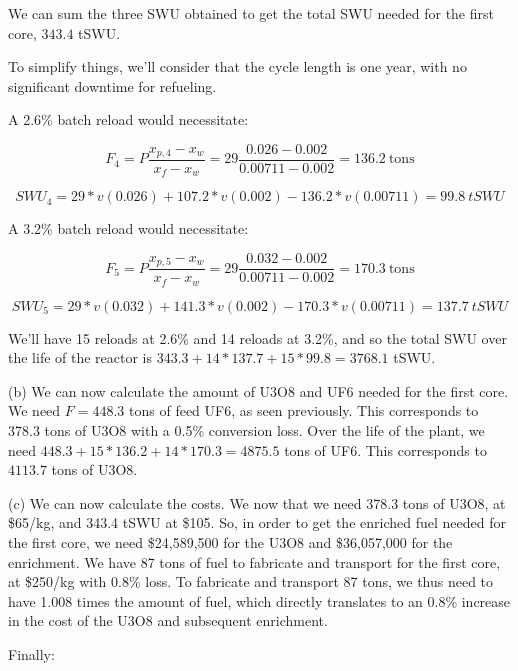 We can sum the three SWU obtained to get the total SWU needed for the first core, $343.4$ tSWU.

To simplify things, we'll consider that the cycle length is one year, with no significant downtime for refueling.

A 2.6\% batch reload would necessitate:

\begin{equation}
F_4 = P\frac{x_{p,4} - x_w}{x_f - x_w} = 29\frac{0.026-0.002}{0.00711-0.002} = 136.2\ \text{tons}
\end{equation}

\begin{equation}
SWU_4 = 29*v(0.026) + 107.2*v(0.002) - 136.2*v(0.00711) = 99.8\ tSWU
\end{equation}

A 3.2\% batch reload would necessitate:

\begin{equation}
F_5 = P\frac{x_{p,5} - x_w}{x_f - x_w} = 29\frac{0.032-0.002}{0.00711-0.002} = 170.3\ \text{tons}
\end{equation}

\begin{equation}
SWU_5 = 29*v(0.032) + 141.3*v(0.002) - 170.3*v(0.00711) = 137.7\ tSWU
\end{equation}

We'll have 15 reloads at 2.6\% and 14 reloads at 3.2\%, and so the total SWU over the life of the reactor is $343.3 + 14*137.7 + 15*99.8 = 3768.1$ tSWU.


(b) We can now calculate the amount of U3O8 and UF6 needed for the first core. We need $F = 448.3$ tons of feed UF6, as seen previously. This corresponds to 378.3 tons of U3O8 with a 0.5\% conversion loss. Over the life of the plant, we need $448.3 + 15 * 136.2 + 14 * 170.3 = 4875.5$ tons of UF6. This corresponds to $4113.7$ tons of U3O8.

(c) We can now calculate the costs. We now that we need 378.3 tons of U3O8, at \$65/kg, and 343.4 tSWU at \$105. So, in order to get the enriched fuel needed for the first core, we need \$24,589,500 for the U3O8 and \$36,057,000 for the enrichment. We have 87 tons of fuel to fabricate and transport for the first core, at \$250/kg with 0.8\% loss. To fabricate and transport 87 tons, we thus need to have 1.008 times the amount of fuel, which directly translates to an 0.8\% increase in the cost of the U3O8 and subsequent enrichment.

Finally:

